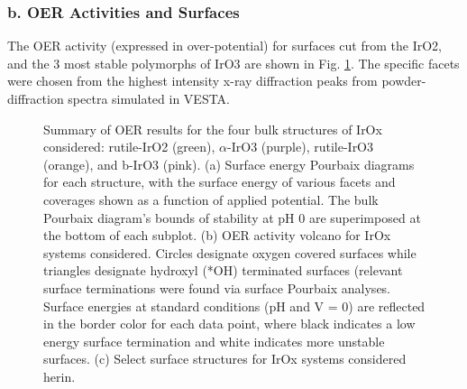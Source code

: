 
\subsubsection{b. OER Activities and Surfaces}


The OER activity (expressed in over-potential) for surfaces cut from the IrO2, and the 3 most stable polymorphs of IrO3 are shown in Fig. \ref{fig:oer_volcano}.
The specific facets were chosen from the highest intensity x-ray diffraction peaks from powder-diffraction spectra simulated in VESTA.


\begin{figure}
\centering
{}
\caption{\label{fig:oer_volcano}
Summary of OER results for the four bulk structures of IrOx considered: rutile-IrO2 (green), $\alpha$-IrO3 (purple), rutile-IrO3 (orange), and b-IrO3 (pink).
(a) Surface energy Pourbaix diagrams for each structure, with the surface energy of various facets and coverages shown as a function of applied potential.
The bulk Pourbaix diagram's bounds of stability at pH 0 are superimposed at the bottom of each subplot.
(b) OER activity volcano for IrOx systems considered.
Circles designate oxygen covered surfaces while triangles designate hydroxyl (*OH) terminated surfaces (relevant surface terminations were found via surface Pourbaix analyses.
Surface energies at standard conditions (pH and V = 0) are reflected in the border color for each data point, where black indicates a low energy surface termination and white indicates more unstable surfaces.  %
(c) Select surface structures for IrOx systems considered herin.
}
\end{figure}

